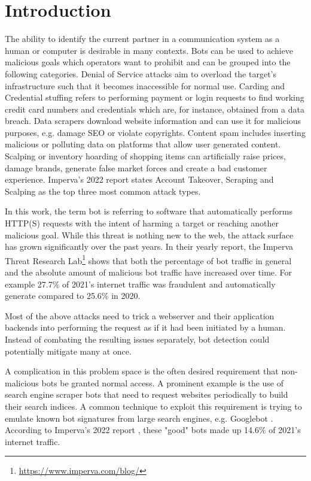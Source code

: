 \documentclass[
    fontsize=12pt,
    headings=small,
    parskip=half,           %
    bibliography=totoc,
    numbers=noenddot,       %
    open=any,               %
    final,                   %
    table
]{scrreprt}
\begin{document}
\tableofcontents

\chapter{Introduction}

The ability to identify the current partner in a communication system as a human or computer is desirable in many contexts. Bots can be used to achieve malicious goals which operators want to prohibit and can be grouped into the following categories. Denial of Service attacks aim to overload the target's infrastructure such that it becomes inaccessible for normal use. Carding and Credential stuffing refers to performing payment or login requests to find working credit card numbers and credentials which are, for instance, obtained from a data breach. Data scrapers download website information and can use it for malicious purposes, e.g. damage SEO or violate copyrights. Content spam includes inserting malicious or polluting data on platforms that allow user generated content. Scalping or inventory hoarding of shopping items can artificially raise prices, damage brands, generate false market forces and create a bad customer experience. Imperva's 2022 report \cite{BAD_BOT_REPORT2022} states Account Takeover, Scraping and Scalping as the top three most common attack types.

In this work, the term bot is referring to software that automatically performs HTTP(S) requests with the intent of harming a target or reaching another malicious goal. While this threat is nothing new to the web, the attack surface has grown significantly over the past years. In their yearly report, the Imperva Threat Research Lab\footnote{\url{https://www.imperva.com/blog/}} shows that both the percentage of bot traffic in general and the absolute amount of malicious bot traffic have increased over time.\cite{BAD_BOT_REPORT2020,BAD_BOT_REPORT2021,BAD_BOT_REPORT2022} For example 27.7\% of 2021's internet traffic was fraudulent and automatically generate compared to 25.6\% in 2020.

Most of the above attacks need to trick a webserver and their application backends into performing the request as if it had been initiated by a human. Instead of combating the resulting issues separately, bot detection could potentially mitigate many at once.

A complication in this problem space is the often desired requirement that non-malicious bots be granted normal access. A prominent example is the use of search engine scraper bots that need to request websites periodically to build their search indices. A common technique to exploit this requirement is trying to emulate known bot signatures from large search engines, e.g. Googlebot \cite{8421894}. According to Imperva's 2022 report \cite{BAD_BOT_REPORT2022}, these "good" bots made up 14.6\% of 2021's internet traffic.
\end{document}
